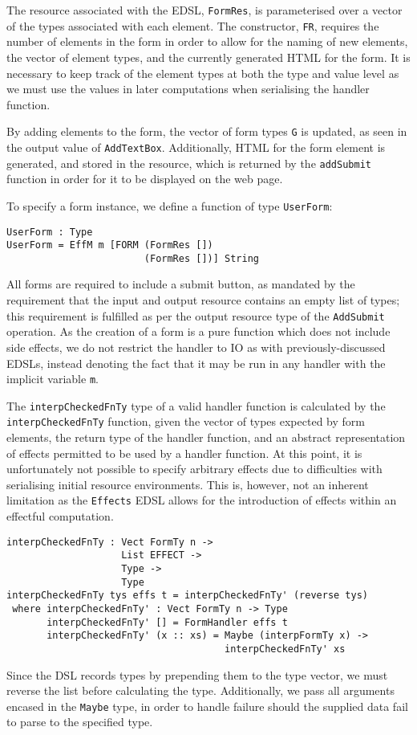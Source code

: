 \documentclass[preprint]{sigplanconf}
\begin{document}
The resource associated with the EDSL, \texttt{FormRes}, is parameterised over a vector of the types associated with each element. The constructor, \texttt{FR}, requires the number of elements in the form in order to allow for the naming of new elements, the vector of element types, and the currently generated HTML for the form. It is necessary to keep track of the element types at both the type and value level as we must use the values in later computations when serialising the handler function. 

By adding elements to the form, the vector of form types \texttt{G} is updated, as seen in the output value of \texttt{AddTextBox}. Additionally, HTML for the form element is generated, and stored in the resource, which is returned by the \texttt{addSubmit} function in order for it to be displayed on the web page.

To specify a form instance, we define a function of type \texttt{UserForm}:
\begin{verbatim}
UserForm : Type
UserForm = EffM m [FORM (FormRes []) 
                        (FormRes [])] String
\end{verbatim}
All forms are required to include a submit button, as mandated by the requirement that the input and output resource contains an empty list of types; this requirement is fulfilled as per the output resource type of the \texttt{AddSubmit} operation. As the creation of a form is a pure function which does not include side effects, we do not restrict the handler to IO as with previously-discussed EDSLs, instead denoting the fact that it may be run in any handler with the implicit variable \texttt{m}.

The \texttt{interpCheckedFnTy} type of a valid handler function is calculated by the \texttt{interpCheckedFnTy} function, given the vector of types expected by form elements, the return type of the handler function, and an abstract representation of effects permitted to be used by a handler function. 
At this point, it is unfortunately not possible to specify arbitrary effects due to difficulties with serialising initial resource environments. This is, however, not an inherent limitation as the \texttt{Effects} EDSL allows for the introduction of effects within an effectful computation.
{\small
\begin{verbatim}
interpCheckedFnTy : Vect FormTy n -> 
                    List EFFECT -> 
                    Type -> 
                    Type
interpCheckedFnTy tys effs t = interpCheckedFnTy' (reverse tys)
 where interpCheckedFnTy' : Vect FormTy n -> Type
       interpCheckedFnTy' [] = FormHandler effs t
       interpCheckedFnTy' (x :: xs) = Maybe (interpFormTy x) ->
                                      interpCheckedFnTy' xs
\end{verbatim}
}
Since the DSL records types by prepending them to the type vector, we must reverse the list before calculating the type. Additionally, we pass all arguments encased in the \texttt{Maybe} type, in order to handle failure should the supplied data fail to parse to the specified type.
\end{document}
